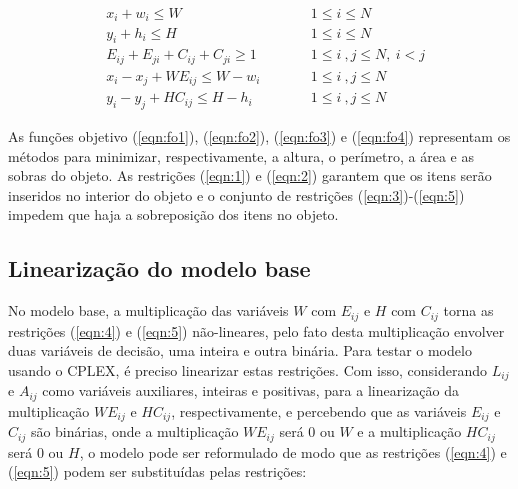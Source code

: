         \begin{small}
            \begin{align}
                \label{eqn:1}
                & {x}_i + {w}_i \leq {W}    && \qquad 1 \leq i \leq N \\
                \label{eqn:2}
                & {y}_i + {h}_i \leq {H}    && \qquad 1 \leq i \leq N \\
                \label{eqn:3}
                & {E}_{ij} + {E}_{ji} + {C}_{ij} + {C}_{ji}  \geq 1   && \qquad 1 \leq i\ , j \leq N, \ i < j \\
                \label{eqn:4}
                & {x}_i - {x}_j + W E_{ij} \leq {W} - {w}_i   && \qquad 1 \leq i\ , j \leq N \\
                \label{eqn:5}
                & {y}_i - {y}_j + H C_{ij} \leq {H} - {h}_i   && \qquad 1 \leq i\ , j \leq N
            \end{align}
        \end{small}
    
        As funções objetivo (\ref{eqn:fo1}), (\ref{eqn:fo2}), (\ref{eqn:fo3}) e (\ref{eqn:fo4}) representam os métodos para minimizar, respectivamente, a altura, o perímetro, a área e as sobras do objeto. As restrições (\ref{eqn:1}) e (\ref{eqn:2}) garantem que os itens serão inseridos no interior do objeto e o conjunto de restrições (\ref{eqn:3})-(\ref{eqn:5}) impedem que haja a sobreposição dos itens no objeto.

        
    \subsection{Linearização do modelo base}
    
        No modelo base, a multiplicação das variáveis $W$ com $E_{ij}$ e $H$ com $C_{ij}$ torna as restrições (\ref{eqn:4}) e (\ref{eqn:5}) não-lineares, pelo fato desta multiplicação envolver duas variáveis de decisão, uma inteira e outra binária. Para testar o modelo usando o CPLEX, é preciso linearizar estas restrições. Com isso, considerando $L_{ij}$ e $A_{ij}$ como variáveis auxiliares, inteiras e positivas, para a linearização da multiplicação $W E_{ij}$ e $H C_{ij}$, respectivamente, e percebendo que as variáveis $E_{ij}$ e $C_{ij}$ são binárias, onde a multiplicação $W E_{ij}$ será 0 ou $W$ e a multiplicação $H C_{ij}$ será 0 ou $H$, o modelo pode ser reformulado de modo que as restrições (\ref{eqn:4}) e (\ref{eqn:5}) podem ser substituídas pelas restrições:

